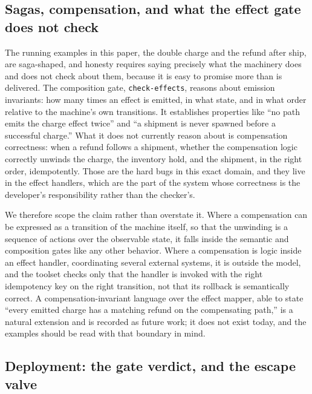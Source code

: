 \documentclass[11pt]{article}
\newcommand{\code}[1]{\texttt{#1}}
\begin{document}
\subsection{Sagas, compensation, and what the effect gate does not check}

The running examples in this paper, the double charge and the refund after ship,
are saga-shaped, and honesty requires saying precisely what the machinery does
and does not check about them, because it is easy to promise more than is
delivered. The composition gate, \code{check-effects}, reasons about emission
invariants: how many times an effect is emitted, in what state, and in what
order relative to the machine's own transitions. It establishes properties like
``no path emits the charge effect twice'' and ``a shipment is never spawned
before a successful charge.'' What it does not currently reason about is
compensation correctness: when a refund follows a shipment, whether the
compensation logic correctly unwinds the charge, the inventory hold, and the
shipment, in the right order, idempotently. Those are the hard bugs in this exact
domain, and they live in the effect handlers, which are the part of the system
whose correctness is the developer's responsibility rather than the checker's.

We therefore scope the claim rather than overstate it. Where a compensation can
be expressed as a transition of the machine itself, so that the unwinding is a
sequence of actions over the observable state, it falls inside the semantic and
composition gates like any other behavior. Where a compensation is logic inside
an effect handler, coordinating several external systems, it is outside the
model, and the toolset checks only that the handler is invoked with the right
idempotency key on the right transition, not that its rollback is semantically
correct. A compensation-invariant language over the effect mapper, able to state
``every emitted charge has a matching refund on the compensating path,'' is a
natural extension and is recorded as future work; it does not exist today, and
the examples should be read with that boundary in mind.

\subsection{Deployment: the gate verdict, and the escape valve}
\end{document}
